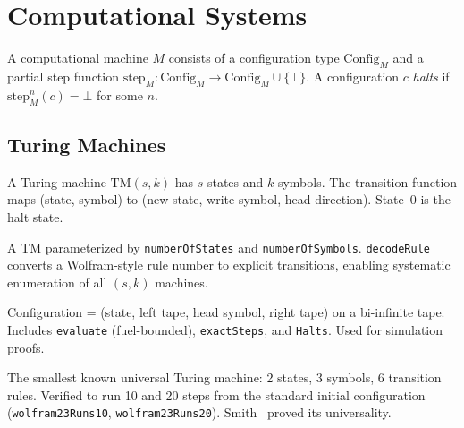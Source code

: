 \chapter{Computational Systems}\label{ch:systems}

\begin{definition}\label{comp-system}
\leanok
A computational machine $M$ consists of a configuration type $\mathrm{Config}_M$
and a partial step function $\mathrm{step}_M : \mathrm{Config}_M \to
\mathrm{Config}_M \cup \{\bot\}$.
A configuration $c$ \emph{halts} if $\mathrm{step}_M^n(c) = \bot$ for some $n$.
\end{definition}

\section{Turing Machines}

A Turing machine $\mathrm{TM}(s,k)$ has $s$ states and $k$ symbols.
The transition function maps (state, symbol) to (new state, write symbol,
head direction). State~0 is the halt state.

\begin{definition}\label{one-sided-tm}
\leanok
{}
A TM parameterized by \texttt{numberOfStates} and \texttt{numberOfSymbols}.
\texttt{decodeRule} converts a Wolfram-style rule number to explicit transitions,
enabling systematic enumeration of all $(s,k)$ machines.
\end{definition}

\begin{definition}[Bi-infinite TM]\label{bi-tm}
\leanok
{}
Configuration = (state, left tape, head symbol, right tape) on a bi-infinite
tape. Includes \texttt{evaluate} (fuel-bounded), \texttt{exactSteps}, and
\texttt{Halts}. Used for simulation proofs.
\end{definition}

\begin{example}[Wolfram's $(2,3)$ TM]\label{wolfram-23-tm}
\leanok
{}
The smallest known universal Turing machine: 2 states, 3 symbols, 6 transition
rules. Verified to run 10 and 20 steps from the standard initial configuration
(\texttt{wolfram23Runs10}, \texttt{wolfram23Runs20}).
Smith~\cite{smith2007universality} proved its universality.
\end{example}

